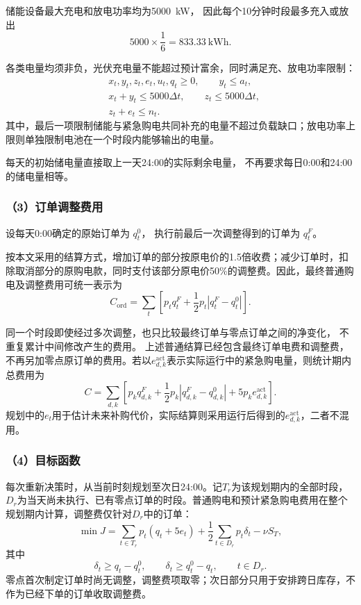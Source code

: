 储能设备最大充电和放电功率均为5000~kW，
因此每个10分钟时段最多充入或放出
\[
5000\times\frac{1}{6}
=
833.33\ \mathrm{kWh}.
\]

各类电量均须非负，光伏充电量不能超过预计富余，同时满足充、放电功率限制：
\begin{equation}
\begin{aligned}
&x_t,y_t,z_t,e_t,u_t,q_t\geq0,\qquad y_t\leq a_t,\\
&x_t+y_t\leq5000\Delta t,\qquad z_t\leq5000\Delta t,\\
&z_t+e_t\leq n_t.
\end{aligned}
\end{equation}
其中，最后一项限制储能与紧急购电共同补充的电量不超过负载缺口；放电功率上限则单独限制电池在一个时段内能够输出的电量。

每天的初始储电量直接取上一天24:00的实际剩余电量，
不再要求每日0:00和24:00的储电量相等。


\subsubsection*{（3）订单调整费用}

设每天0:00确定的原始订单为 $q_t^0$，
执行前最后一次调整得到的订单为 $q_t^F$。

按本文采用的结算方式，增加订单的部分按原电价的1.5倍收费；减少订单时，扣除取消部分的原购电款，同时支付该部分原电价50\%的调整费。因此，最终普通购电及调整费用可统一表示为
\begin{equation}
C_{\mathrm{ord}}
=
\sum_t
\left[
p_tq_t^F
+
\frac{1}{2}p_t
\left|
q_t^F-q_t^0
\right|
\right].
\end{equation}

同一个时段即使经过多次调整，也只比较最终订单与零点订单之间的净变化，
不重复累计中间修改产生的费用。
上述普通结算已经包含最终订单电费和调整费，不再另加零点原订单的费用。若以$e_{d,k}^{\mathrm{act}}$表示实际运行中的紧急购电量，则统计期内总费用为
\begin{equation}
C=\sum_{d,k}\left[
p_kq_{d,k}^{F}
+\frac{1}{2}p_k\left|q_{d,k}^{F}-q_{d,k}^{0}\right|
+5p_ke_{d,k}^{\mathrm{act}}
\right].
\end{equation}
规划中的$e_t$用于估计未来补购代价，实际结算则采用运行后得到的$e_{d,k}^{\mathrm{act}}$，二者不混用。


\subsubsection*{（4）目标函数}

每次重新决策时，从当前时刻规划至次日24:00。记$T_r$为该规划期内的全部时段，$D_r$为当天尚未执行、已有零点订单的时段。普通购电和预计紧急购电费用在整个规划期内计算，调整费仅针对$D_r$中的订单：
\begin{equation}
\min J=
\sum_{t\in T_r}p_t(q_t+5e_t)
+\frac{1}{2}\sum_{t\in D_r}p_t\delta_t
-\nu S_T,
\end{equation}
其中
\begin{equation}
\delta_t\geq q_t-q_t^0,\qquad
\delta_t\geq q_t^0-q_t,\qquad t\in D_r.
\end{equation}
零点首次制定订单时尚无调整，调整费项取零；次日部分只用于安排跨日库存，不作为已经下单的订单收取调整费。

